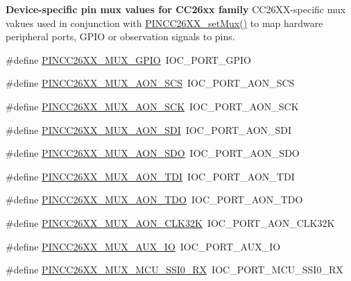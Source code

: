 \begin{Indent}{\bf Device-\/specific pin mux values for C\+C26xx family}
{C\+C26\+X\+X-\/specific mux vakues used in conjunction with \hyperlink{_p_i_n_c_c26_x_x_8h_ac8cbb649db80dd03d8e8a487aef43294}{P\+I\+N\+C\+C26\+X\+X\+\_\+set\+Mux()} to map hardware peripheral ports, G\+P\+I\+O or observation signals to pins. }\begin{DoxyCompactItemize}
\item 
\#define \hyperlink{_p_i_n_c_c26_x_x_8h_afc65e6d65f939680cc596a207713b5c4}{P\+I\+N\+C\+C26\+X\+X\+\_\+\+M\+U\+X\+\_\+\+G\+P\+I\+O}~I\+O\+C\+\_\+\+P\+O\+R\+T\+\_\+\+G\+P\+I\+O
\item 
\#define \hyperlink{_p_i_n_c_c26_x_x_8h_aaec6571cc330fad7cc0f456ce92e54c0}{P\+I\+N\+C\+C26\+X\+X\+\_\+\+M\+U\+X\+\_\+\+A\+O\+N\+\_\+\+S\+C\+S}~I\+O\+C\+\_\+\+P\+O\+R\+T\+\_\+\+A\+O\+N\+\_\+\+S\+C\+S
\item 
\#define \hyperlink{_p_i_n_c_c26_x_x_8h_a4dd135e99cb2ef3c9d6025b927b65d4b}{P\+I\+N\+C\+C26\+X\+X\+\_\+\+M\+U\+X\+\_\+\+A\+O\+N\+\_\+\+S\+C\+K}~I\+O\+C\+\_\+\+P\+O\+R\+T\+\_\+\+A\+O\+N\+\_\+\+S\+C\+K
\item 
\#define \hyperlink{_p_i_n_c_c26_x_x_8h_a9a32e54a0307edd69c4f398ee243e555}{P\+I\+N\+C\+C26\+X\+X\+\_\+\+M\+U\+X\+\_\+\+A\+O\+N\+\_\+\+S\+D\+I}~I\+O\+C\+\_\+\+P\+O\+R\+T\+\_\+\+A\+O\+N\+\_\+\+S\+D\+I
\item 
\#define \hyperlink{_p_i_n_c_c26_x_x_8h_a9a26180801d733cc5141d9d4bfe32fb8}{P\+I\+N\+C\+C26\+X\+X\+\_\+\+M\+U\+X\+\_\+\+A\+O\+N\+\_\+\+S\+D\+O}~I\+O\+C\+\_\+\+P\+O\+R\+T\+\_\+\+A\+O\+N\+\_\+\+S\+D\+O
\item 
\#define \hyperlink{_p_i_n_c_c26_x_x_8h_ad451f024f76688fc7eb41557536db30b}{P\+I\+N\+C\+C26\+X\+X\+\_\+\+M\+U\+X\+\_\+\+A\+O\+N\+\_\+\+T\+D\+I}~I\+O\+C\+\_\+\+P\+O\+R\+T\+\_\+\+A\+O\+N\+\_\+\+T\+D\+I
\item 
\#define \hyperlink{_p_i_n_c_c26_x_x_8h_a431c98678be9df655e80bc7e2386e9dc}{P\+I\+N\+C\+C26\+X\+X\+\_\+\+M\+U\+X\+\_\+\+A\+O\+N\+\_\+\+T\+D\+O}~I\+O\+C\+\_\+\+P\+O\+R\+T\+\_\+\+A\+O\+N\+\_\+\+T\+D\+O
\item 
\#define \hyperlink{_p_i_n_c_c26_x_x_8h_a99871b823a34287bfc2027606551db4d}{P\+I\+N\+C\+C26\+X\+X\+\_\+\+M\+U\+X\+\_\+\+A\+O\+N\+\_\+\+C\+L\+K32\+K}~I\+O\+C\+\_\+\+P\+O\+R\+T\+\_\+\+A\+O\+N\+\_\+\+C\+L\+K32\+K
\item 
\#define \hyperlink{_p_i_n_c_c26_x_x_8h_a7fc71cdd74fbd97d4297ffed39302713}{P\+I\+N\+C\+C26\+X\+X\+\_\+\+M\+U\+X\+\_\+\+A\+U\+X\+\_\+\+I\+O}~I\+O\+C\+\_\+\+P\+O\+R\+T\+\_\+\+A\+U\+X\+\_\+\+I\+O
\item 
\#define \hyperlink{_p_i_n_c_c26_x_x_8h_ac72b13e3e19d75a4ce2240955786660d}{P\+I\+N\+C\+C26\+X\+X\+\_\+\+M\+U\+X\+\_\+\+M\+C\+U\+\_\+\+S\+S\+I0\+\_\+\+R\+X}~I\+O\+C\+\_\+\+P\+O\+R\+T\+\_\+\+M\+C\+U\+\_\+\+S\+S\+I0\+\_\+\+R\+X

\end{DoxyCompactItemize}
\end{Indent}
